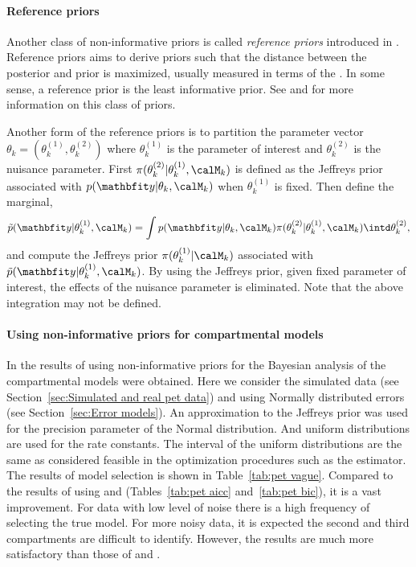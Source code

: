 \paragraph{Reference priors}

Another class of non-informative priors is called \emph{reference priors}
introduced in \cite{Bernardo:1979uq}. Reference priors aims to derive priors
such that the distance between the posterior and prior is maximized, usually
measured in terms of the \kld \cite{Kullback:1951va}. In some sense, a
reference prior is the least informative prior. See \cite{Berger:1989vj,
  Berger:1992kf, Berger:1992wo} and \cite[][sec.~5.4]{Bernardo:1994vd} for
more information on this class of priors.

Another form of the reference priors is to partition the parameter vector
$\theta_k = (\theta_k^{(1)},\theta_k^{(2)})$ where $\theta_k^{(1)}$ is the
parameter of interest and $\theta_k^{(2)}$ is the nuisance parameter.  First
$\pi(\theta_k^{(2)}|\theta_k^{(1)},\calM_k)$ is defined as the Jeffreys prior
associated with $p(\data|\theta_k,\calM_k)$ when $\theta_k^{(1)}$ is fixed.
Then define the marginal,
\begin{equation}
  \tilde{p}(\data|\theta_k^{(1)},\calM_k) =
  \int p(\data|\theta_k,\calM_k)\pi(\theta_k^{(2)}|\theta_k^{(1)},\calM_k)
  \intd \theta_k^{(2)},
\end{equation}
and compute the Jeffreys prior $\pi(\theta_k^{(1)}|\calM_k)$ associated with
$\tilde{p}(\data|\theta_k^{(1)},\calM_k)$. By using the Jeffreys prior, given
fixed parameter of interest, the effects of the nuisance parameter is
eliminated. Note that the above integration may not be defined.

\paragraph{Using non-informative priors for \pet compartmental models}

In \cite{Zhou2013} the results of using non-informative priors for the
Bayesian analysis of the \pet compartmental models were obtained. Here we
consider the simulated data (see Section~\ref{sec:Simulated and real pet
  data}) and using Normally distributed errors (see Section~\ref{sec:Error
  models}). An approximation to the Jeffreys prior was used for the precision
parameter of the Normal distribution. And uniform distributions are used for
the rate constants. The interval of the uniform distributions are the same as
considered feasible in the optimization procedures such as the \nls estimator.
The results of model selection is shown in Table~\ref{tab:pet vague}. Compared
to the results of using \aicc and \bic (Tables~\ref{tab:pet aicc}
and~\ref{tab:pet bic}), it is a vast improvement. For data with low level of
noise there is a high frequency of selecting the true model. For more noisy
data, it is expected the second and third compartments are difficult to
identify. However, the results are much more satisfactory than those of \aicc
and \bic.

